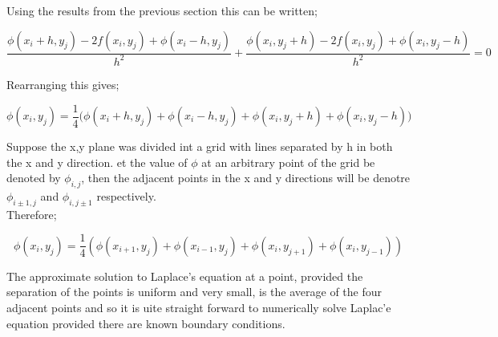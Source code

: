\documentclass[a4paper, 11pt]{article}
\begin{document}
Using the results from the previous section this can be written;

\[\frac{\phi(x_i+h,y_j)-2f(x_i,y_j)+\phi(x_i-h,y_j)}{h^2} +  \frac{\phi(x_i,y_j+h)-2f(x_i,y_j)+\phi(x_i,y_j-h)}{h^2}=0\]

Rearranging this gives;

\[\phi(x_i,y_j)=\frac{1}{4}\Bigg(\phi(x_i+h,y_j)+\phi(x_i-h,y_j)+\phi(x_i,y_j+h)+\phi(x_i,y_j-h)\Bigg)\]

Suppose the x,y plane was divided int a grid with lines separated by h in both the x and y direction. et the value of \(\phi\) at an arbitrary point of the grid be denoted by \(\phi_{i,j}\), then the adjacent points in the x and y directions will be denotre \(\phi_{i\pm1,j}\) and \(\phi_{i,j\pm1}\) respectively.\\Therefore;

\[\phi(x_i,y_j)=\frac{1}{4}(\phi(x_{i+1},y_j)+\phi(x_{i-1},y_j)+\phi(x_i,y_{j+1})+\phi(x_i,y_{j-1}))\]

The approximate solution to Laplace's equation at a point, provided the separation of the points is uniform and very small, is the average of the four adjacent points and so it is uite straight forward to numerically solve Laplac'e equation provided there are known boundary conditions.
\end{document}
